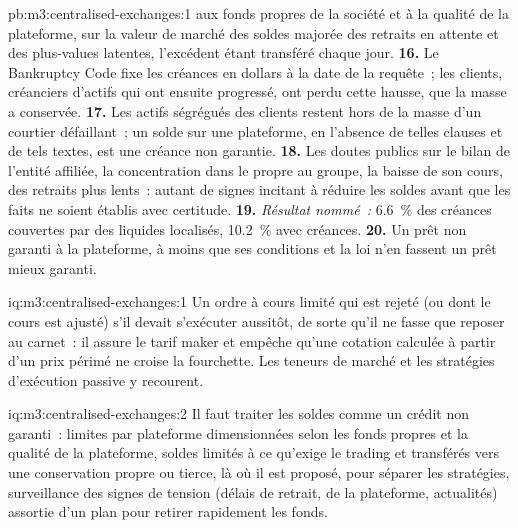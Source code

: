 \begin{solution}{pb:m3:centralised-exchanges:1}
aux fonds propres de la société et à la qualité de la plateforme, sur la valeur de marché des soldes majorée des retraits en attente
et des plus-values latentes, l'excédent étant transféré chaque jour. \textbf{16.} Le Bankruptcy Code fixe les créances en dollars
à la date de la requête~; les clients, créanciers d'actifs qui ont ensuite progressé, ont perdu cette hausse, que la masse a conservée.
\textbf{17.} Les actifs ségrégués des clients restent hors de la masse d'un courtier défaillant~; un solde sur une plateforme, en l'absence
de telles clauses et de tels textes, est une créance non garantie. \textbf{18.} Les doutes publics sur le bilan de l'entité affiliée,
la concentration dans le  propre au groupe, la baisse de son cours, des retraits plus lents~: autant de signes incitant à réduire les soldes
avant que les faits ne soient établis avec certitude. \textbf{19.} \emph{Résultat nommé~:} 6.6~\% des créances couvertes par
des  liquides localisés, 10.2~\% avec créances. \textbf{20.} Un prêt non garanti à la plateforme, à moins que ses
conditions et la loi n'en fassent un prêt mieux garanti.
\end{solution}

\begin{solution}{iq:m3:centralised-exchanges:1}
Un ordre à cours limité qui est rejeté (ou dont le cours est ajusté) s'il devait s'exécuter aussitôt, de sorte qu'il ne fasse que reposer au carnet~: il
assure le tarif maker et empêche qu'une cotation calculée à partir d'un prix périmé ne croise la fourchette. Les teneurs
de marché et les stratégies d'exécution passive y recourent.
\end{solution}

\begin{solution}{iq:m3:centralised-exchanges:2}
Il faut traiter les soldes comme un crédit non garanti~: limites par plateforme dimensionnées selon les fonds propres et la qualité de la plateforme, soldes limités
à ce qu'exige le trading et transférés vers une conservation propre ou tierce,  là où il est proposé, 
pour séparer les stratégies, surveillance des signes de tension (délais de retrait,  de la plateforme, actualités) assortie d'un plan
pour retirer rapidement les fonds.
\end{solution}

